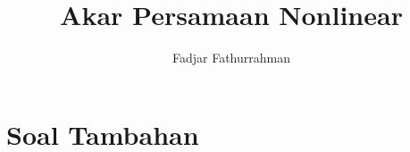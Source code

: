 




\title{Akar Persamaan Nonlinear}
\author{Fadjar Fathurrahman}
\date{}
\maketitle












\section{Soal Tambahan}

%
%















